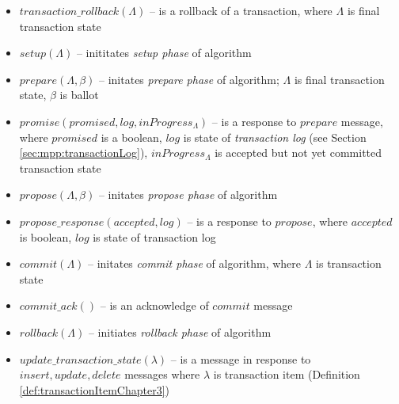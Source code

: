 \begin{definition}
\begin{itemize}
	\item $\mathit{transaction\_rollback}(\Lambda)$ -- is a rollback of a transaction, where $\Lambda$ is final transaction state 
	\item $\mathit{setup}(\Lambda)$ -- inititates \emph{setup phase} of \mpt algorithm 
	\item $\mathit{prepare}(\Lambda, \beta)$ -- initates \emph{prepare phase} of \mpt algorithm; $\Lambda$ is final transaction state, $\beta$ is \paxos ballot 
	\item $\mathit{promise(promised, log, inProgress_{\Lambda})}$ -- is a response to $\mathit{prepare}$ message, where $\mathit{promised}$ is a boolean, $\mathit{log}$ is state of \emph{transaction log} (see Section \ref{sec:mpp:transactionLog}), $\mathit{inProgress_{\Lambda}}$ is accepted but not yet committed transaction state 
	\item $\mathit{propose}(\Lambda, \beta)$ -- initates \emph{propose phase} of \mpt algorithm
	\item $\mathit{propose\_response}(accepted, log)$ -- is a response to $\mathit{propose}$, where $\mathit{accepted}$ is boolean, $\mathit{log}$ is state of transaction log 
	\item $\mathit{commit}(\Lambda)$ -- initates \emph{commit phase} of \mpt algorithm, where $\Lambda$ is transaction state 
	\item $\mathit{commit\_ack()}$ -- is an acknowledge of $\mathit{commit}$ message 
	\item $\mathit{rollback}(\Lambda)$ -- initiates \emph{rollback phase} of \mpt algorithm
	\item $\mathit{update\_transaction\_state}(\lambda)$ -- is a message in response to $\mathit{insert, update, delete}$ messages where $\lambda$ is transaction item (Definition \ref{def:transactionItemChapter3}) 
	\end{itemize}
\end{definition}



